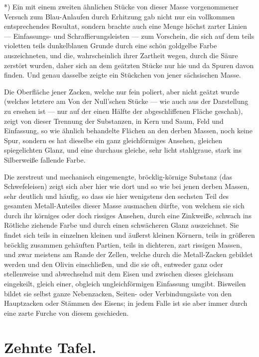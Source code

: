 \documentclass[a4paper, 11pt, oneside, german]{article}
\begin{document}
*) Ein mit einem zweiten ähnlichen Stücke von dieser Masse vorgenommener Versuch zum Blau-Anlaufen durch Erhitzung gab nicht nur ein vollkommen entsprechendes Resultat, sondern brachte auch eine Menge höchst zarter Linien --- Einfassungs- und Schraffierungsleisten --- zum Vorschein, die sich auf dem teils violetten teils dunkelblauen Grunde durch eine schön goldgelbe Farbe auszeichneten, und die, wahrscheinlich ihrer Zartheit wegen, durch die Säure zerstört wurden, daher sich an dem geätzten Stücke nur hie und da Spuren davon finden. Und genau dasselbe zeigte ein Stückchen von jener sächsischen Masse.

Die Oberfläche jener Zacken, welche nur fein poliert, aber nicht geätzt wurde (welches letztere am Von der Null'schen Stücke --- wie auch aus der Darstellung zu ersehen ist --- nur auf der einen Hälfte der abgeschliffenen Fläche geschah), zeigt von dieser Trennung der Substanzen, in Kern und Saum, Feld und Einfassung, so wie ähnlich behandelte Flächen an den derben Massen, noch keine Spur, sondern es hat dieselbe ein ganz gleichförmiges Ansehen, gleichen spiegelichten Glanz, und eine durchaus gleiche, sehr licht stahlgraue, stark ins Silberweiße fallende Farbe.

Die zerstreut und mechanisch eingemengte, bröcklig-körnige Substanz (das Schwefeleisen) zeigt sich aber hier wie dort und so wie bei jenen derben Massen, sehr deutlich und häufig, so dass sie hier wenigstens den sechsten Teil des gesamten Metall-Anteiles dieser Masse ausmachen dürfte, von welchem sie sich durch ihr körniges oder doch rissiges Ansehen, durch eine Zinkweiße, schwach ins Rötliche ziehende Farbe und durch einen schwächeren Glanz auszeichnet. Sie findet sich teils in einzelnen kleinen und äußerst kleinen Körnern, teils in größeren bröcklig zusammen gehäuften Partien, teils in dichteren, zart rissigen Massen, und zwar meistens am Rande der Zellen, welche durch die Metall-Zacken gebildet werden und den Olivin einschließen, und die sie oft, entweder ganz oder stellenweise und abwechselnd mit dem Eisen und zwischen dieses gleichsam eingekeilt, gleich einer, obgleich ungleichförmigen Einfassung umgibt. Bisweilen bildet sie selbst ganze Nebenzacken, Seiten- oder Verbindungsäste von den Hauptzacken oder Stämmen des Eisens; in jedem Falle ist sie aber immer durch eine zarte Furche von diesem geschieden.

\section{Zehnte Tafel.}
\end{document}
